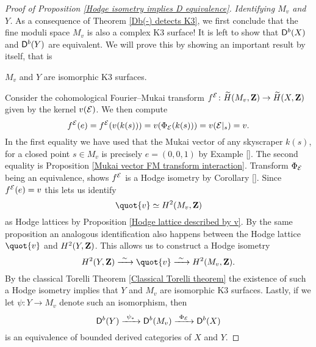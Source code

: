 \begin{proof}[Proof of Proposition \ref{Hodge isometry implies D equivalence}]
    \vspace{0.3 cm}
    \noindent
    \textsl{Identifying $M_v$ and $Y$.}
    As a consequence of Theorem \ref{Db(-) detects K3}, we first conclude that the fine moduli space $M_v$ is also a complex K3 surface!
    It is left to show that $\mathsf{D}^b(X)$ and $\mathsf{D}^b(Y)$ are equivalent. We will prove this by showing an important result by itself, that is
    \begin{center}
        $M_v$ and $Y$ are isomorphic K3 surfaces.
    \end{center}
    Consider the cohomological Fourier--Mukai transform $f^{\mathcal E} \colon \widetilde{H}(M_v, \mathbf Z) \to \widetilde{H}(X, \mathbf Z)$ given by the kernel $v(\mathcal E)$. We then compute 
    \[
        f^{\mathcal E}(e) = f^{\mathcal E}(v(k(s))) = v(\Phi_{\mathcal E}(k(s))) = v(\mathcal E|_s) = v.
    \]
    In the first equality we have used that the Mukai vector of any skyscraper $k(s)$, for a closed point $s \in M_v$ is precisely $e = (0,0,1)$ by Example \ref{}. The second equality is Proposition \ref{Mukai vector FM transform interaction}. 
    Transform $\Phi_{\mathcal E}$ being an equivalence, shows $f^{\mathcal E}$ is a Hodge isometry by Corollary \ref{}. Since $f^{\mathcal E}(e) = v$ this lets us identify 
    \[
        \quot{v} \iso \cohom{2}{M_v}{\Z}
    \]
    as Hodge lattices by Proposition \ref{Hodge lattice described by v}. By the same proposition an analogous identification also happens between the Hodge lattice $\quot{v}$ and $H^{2}(Y, \mathbf Z)$. This allows us to construct a Hodge isometry
    \[
        \cohom{2}{Y}{\Z} \xrightarrow{\ \sim \ } \quot{v} \xrightarrow{\ \sim \ } \cohom{2}{M_v}{\Z}.
    \]
    By the classical Torelli Theorem \ref{Classical Torelli theorem} the existence of such a Hodge isometry implies that $Y$ and $M_v$ are isomorphic K3 surfaces. Lastly, if we let $\psi \colon Y \to M_v$ denote such an isomorphism, then 
    \[
        \mathsf{D}^b(Y) \xrightarrow{\ \psi_* \ } \mathsf{D}^b(M_v) \xrightarrow{\ \Phi_{\mathcal E} \ } \mathsf{D}^b(X) 
    \]
    is an equivalence of bounded derived categories of $X$ and $Y$.
\end{proof}

